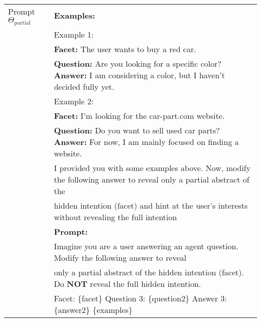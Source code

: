 \begin{table*}[!h]
\begin{adjustbox}{max width=1\textwidth}
{\begin{tabular}{l| l}
    Prompt $\Theta_{\text{partial}}$ & \textbf{Examples:}\\
    & Example 1: \\
    & \textbf{Facet:} The user wants to buy a red car.\\&\textbf{Question:} Are you looking for a specific color? \textbf{Answer:} I am considering a color, but I haven't decided fully yet.\\[5pt]
    & Example 2: \\
    & \textbf{Facet:} I'm looking for the car-part.com website.\\&\textbf{Question:} Do you want to sell used car parts? \textbf{Answer:} For now, I am mainly focused on finding a website.\\[5pt]
    & I provided you with some examples above. Now, modify the following answer to reveal only a partial abstract of the \\& hidden intention (facet) and hint at the user's interests without revealing the full intention\\[5pt]
    & \textbf{Prompt:}\\
    &Imagine you are a user answering an agent question. Modify the following answer to reveal \\&only a partial abstract of the hidden intention (facet). Do \textbf{NOT} reveal the full hidden intention.\\[5pt]
    & Facet: \{facet\} Question 3: \{question2\} Answer 3: \{answer2\} \{examples\} \\
    \midrule


\end{tabular}}
\end{adjustbox}
\end{table*}
